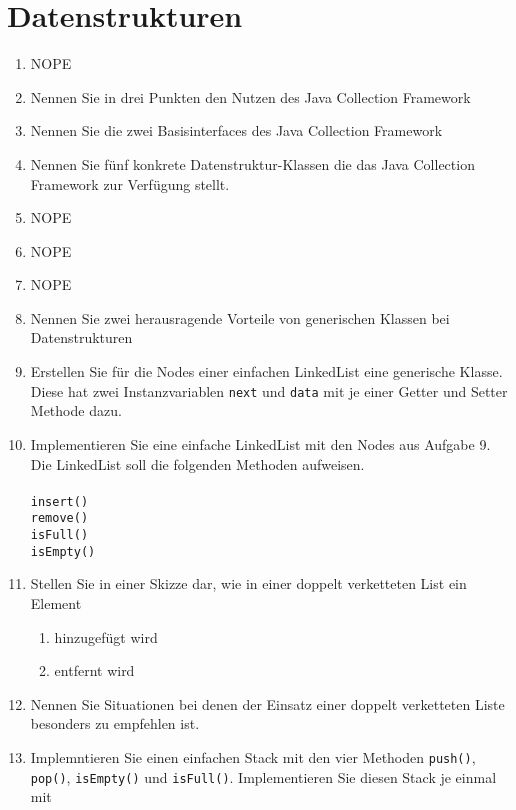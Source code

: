 \newpage
\section{Datenstrukturen}

\begin{enumerate}
	\item NOPE
	\item Nennen Sie in drei Punkten den Nutzen des Java Collection 
		Framework
	\item Nennen Sie die zwei Basisinterfaces des Java Collection
        Framework
	\item Nennen Sie fünf konkrete Datenstruktur-Klassen die das
        Java Collection Framework zur Verfügung stellt. 
	\item NOPE
	\item NOPE
	\item NOPE
	\item Nennen Sie zwei herausragende Vorteile von generischen 
        Klassen bei Datenstrukturen
	\item Erstellen Sie für die Nodes einer einfachen LinkedList
        eine generische Klasse. Diese hat zwei Instanzvariablen
        \verb?next? und \verb?data? mit je einer Getter und Setter
        Methode dazu. 
	\item Implementieren Sie eine einfache LinkedList mit den 
        Nodes aus Aufgabe 9. Die LinkedList soll die folgenden
        Methoden aufweisen.\\\\
        \verb?insert()?\\
        \verb?remove()?\\
        \verb?isFull()?\\
        \verb?isEmpty()?
	\item Stellen Sie in einer Skizze dar, wie in einer doppelt
        verketteten List ein Element
        \begin{enumerate}[label=(\alph*)]
            \item hinzugefügt wird
            \item entfernt wird
        \end{enumerate}
	\item Nennen Sie Situationen bei denen der Einsatz einer doppelt
        verketteten Liste besonders zu empfehlen ist.
	\item Implemntieren Sie einen einfachen Stack mit den vier Methoden
        \verb?push()?, \verb?pop()?, \verb?isEmpty()? und \verb?isFull()?.
        Implementieren Sie diesen Stack je einmal mit

\end{enumerate}
